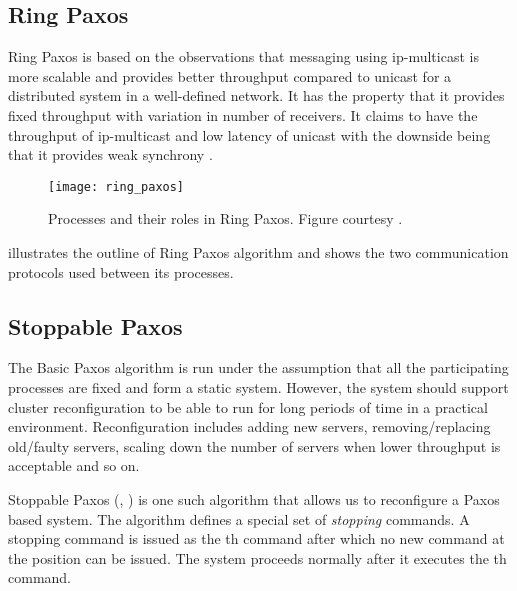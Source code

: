 \subsection{Ring Paxos}

Ring Paxos \citep{MarandiPSP10} is based on the observations that messaging
using ip-multicast%
is more scalable and provides better throughput compared
to unicast%
for a distributed system in a well-defined network. It
has the property that it provides fixed throughput with variation in number
of receivers. It claims to have the throughput of ip-multicast and low latency
of unicast with the downside being that it provides weak synchrony%
.

\begin{figure}
  \texttt{[image: ring\_paxos]}
  \caption[Ring Paxos]{%
  Processes and their roles in Ring Paxos. Figure courtesy
  \citep{MarandiPSP10}.}
  \label{figure:ring.paxos}
\end{figure}

 illustrates the outline of Ring Paxos algorithm and
shows the two communication protocols used between its processes.

\subsection{Stoppable Paxos}

The Basic Paxos algorithm is run under the assumption that all the participating
processes are fixed and form a static system. However, the system should
support cluster reconfiguration to be able to run for long periods of time in a
practical environment. Reconfiguration includes adding new servers,
removing/replacing old/faulty servers, scaling down the number of servers
when lower throughput is acceptable and so on.

Stoppable Paxos (\citet{LamportSP08}, \citet{LamportMZ10}) is one such algorithm
that allows us to reconfigure a Paxos based system. The algorithm defines a
special set of \emph{stopping} commands. A stopping command is issued as the
th command after which no new command at the position can be
issued. The system proceeds normally after it executes the th command.

